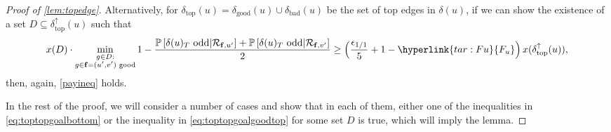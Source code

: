 \begin{proof}[Proof of \cref{lem:topedge}]
Alternatively, for $\delta_\text{top}(u)=\delta_\text{good}(u)\cup\delta_\text{bad}(u)$ be the set of top edges in $\delta(u)$, if we can show the existence of a set $D\subseteq \delta^\uparrow_\text{top}(u)$ such that 
\begin{equation}	\label{eq:toptopgoalgoodtop}
 x(D)\cdot \min_{\substack{g\in D:\\ g\in\bbf=(u',v') \text{ good}}}1-\frac{\P{\delta(u)_T\text{ odd}|\cR_{\bbf,u'}} + \P{\delta(u)_T\text{ odd} | \cR_{\bbf,v'}}}{2}\geq  \left(\frac{\eps_{1/1}}{5} + 1-\hyperlink{tar:Fu}{F_u}\right)x(\delta^\uparrow_\text{top}(u)),
\end{equation}
then, again, \eqref{payineq} holds.

In the rest of the proof, we will consider a number of cases and show that in each of them, either one of the inequalities in \eqref{eq:toptopgoalbottom} or the inequality in \eqref{eq:toptopgoalgoodtop} for some set $D$ is true, which will imply the lemma.






\end{proof}
